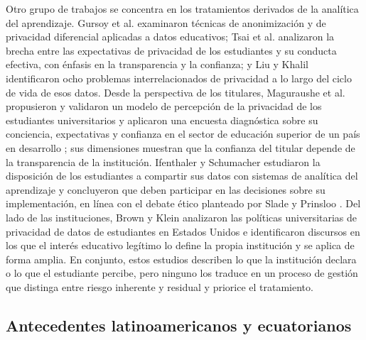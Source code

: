 Otro grupo de trabajos se concentra en los tratamientos derivados de la analítica del aprendizaje. Gursoy et al. \cite{gursoy2017ppla} examinaron técnicas de anonimización y de privacidad diferencial aplicadas a datos educativos; Tsai et al. \cite{tsai2020privacy} analizaron la brecha entre las expectativas de privacidad de los estudiantes y su conducta efectiva, con énfasis en la transparencia y la confianza; y Liu y Khalil \cite{liu2023privacy} identificaron ocho problemas interrelacionados de privacidad a lo largo del ciclo de vida de esos datos. Desde la perspectiva de los titulares, Maguraushe et al. propusieron y validaron un modelo de percepción de la privacidad de los estudiantes universitarios \cite{maguraushe2024model} y aplicaron una encuesta diagnóstica sobre su conciencia, expectativas y confianza en el sector de educación superior de un país en desarrollo \cite{maguraushe2026privacy}; sus dimensiones muestran que la confianza del titular depende de la transparencia de la institución. Ifenthaler y Schumacher \cite{ifenthaler2016student} estudiaron la disposición de los estudiantes a compartir sus datos con sistemas de analítica del aprendizaje y concluyeron que deben participar en las decisiones sobre su implementación, en línea con el debate ético planteado por Slade y Prinsloo \cite{slade2013learning}. Del lado de las instituciones, Brown y Klein \cite{brown2020whose} analizaron las políticas universitarias de privacidad de datos de estudiantes en Estados Unidos e identificaron discursos en los que el interés educativo legítimo lo define la propia institución y se aplica de forma amplia. En conjunto, estos estudios describen lo que la institución declara o lo que el estudiante percibe, pero ninguno los traduce en un proceso de gestión que distinga entre riesgo inherente y residual y priorice el tratamiento.

\subsection{Antecedentes latinoamericanos y ecuatorianos}


